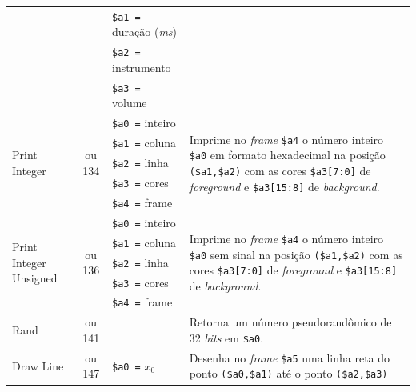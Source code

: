 \begin{longtable}{|l|c|p{3.5cm}|l |}
            & & \texttt{\$a1 =} duração (\textit{ms}) & \\*
            & & \texttt{\$a2 =} instrumento & \\*
            & & \texttt{\$a3 =} volume      & \\
        \hline
        \multirow{5}{*}{Print Integer}      & \multirow{5}{*}{\parbox{0.6cm}{ ou 134}}
              & \texttt{\$a0 =} inteiro     & \multirow{5}{*}{\parbox{7cm}{Imprime no \textit{frame} \texttt{\$a4} o número inteiro \texttt{\$a0} em formato hexadecimal na
                                                posição \texttt{(\$a1,\$a2)} com as cores \texttt{\$a3[7:0]} de \textit{foreground} e \texttt{\$a3[15:8]} de \textit{background}.}}\\*
            & & \texttt{\$a1 =} coluna      & \\*
            & & \texttt{\$a2 =} linha       & \\*
            & & \texttt{\$a3 =} cores       & \\*
            & & \texttt{\$a4 =} frame       & \\
        \hline
        \multirow{5}{*}{Print Integer Unsigned} & \multirow{5}{*}{\parbox{0.6cm}{ ou 136}}
              & \texttt{\$a0 =} inteiro     & \multirow{5}{*}{\parbox{7cm}{Imprime no \textit{frame} \texttt{\$a4} o número inteiro \texttt{\$a0} sem sinal na
                                                posição \texttt{(\$a1,\$a2)} com as cores \texttt{\$a3[7:0]} de \textit{foreground} e \texttt{\$a3[15:8]} de \textit{background}.}}\\*
            & & \texttt{\$a1 =} coluna      & \\*
            & & \texttt{\$a2 =} linha       & \\*
            & & \texttt{\$a3 =} cores       & \\*
            & & \texttt{\$a4 =} frame       & \\
        \hline
        \multirow{3}{*}{Rand}               & \multirow{3}{*}{\parbox{0.6cm}{ ou 141}}
            & & \multirow{3}{*}{\parbox{7cm}{Retorna um número pseudorandômico de 32 \textit{bits} em \texttt{\$a0}.}}\\*
            & & & \\*
            & & & \\
        \hline
        \multirow{6}{*}{Draw Line}          & \multirow{6}{*}{\parbox{0.6cm}{ ou 147}}
              & \texttt{\$a0 =} $x_0$       & \multirow{6}{*}{\parbox{7cm}{Desenha no \textit{frame} \texttt{\$a5} uma linha reta do ponto \texttt{(\$a0,\$a1)} até o ponto \texttt{(\$a2,\$a3)}
}}
\end{longtable}
